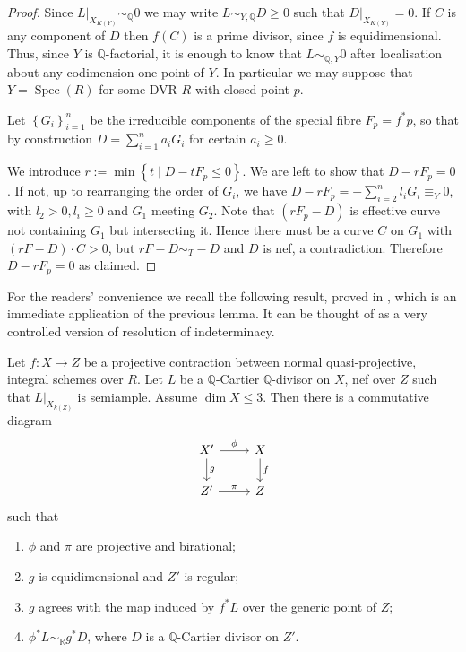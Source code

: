 \documentclass[a4paper,12pt]{book}
\DeclareMathOperator{\Spec}{Spec}
\newcommand{\bQ}{\mathbb{Q}}
\begin{document}
	\begin{proof}
		Since $L|_{X_{K(Y)}} \sim_{\mathbb{Q}} 0$ we may write $L\sim_{Y, \mathbb{Q}} D\geq 0$ such that $D|_{X_{K(Y)}}=0$. If $C$ is any component of $D$ then $f(C)$ is a prime divisor, since $f$ is equidimensional. Thus, since $Y$ is $\mathbb{Q}$-factorial, it is enough to know that $L \sim_{\bQ,Y} 0$ after localisation about any codimension one point of $Y$. In particular we may suppose that $Y= \Spec (R)$ for some DVR $R$ with closed point $p$.
		
		Let $\left\{G_i \right\}_{i=1}^n$ be the irreducible components of the special fibre $F_p=f^*p$, so that by construction $D = \sum_{i=1}^n a_i G_i$ for certain $a_i \geq 0$.	
		
		We introduce $r:= \min \left\{ t \mid D -tF_p \leq 0 \right\}$. We are left to show that $D-rF_p=0$. 
		If not, up to rearranging the order of $G_i$, we have $D-rF_p=-\sum_{i=2}^n l_i G_i \equiv_Y 0$, with $l_2 >0, l_i \geq 0$ and $G_{1}$ meeting $G_{2}$. Note that $(rF_p-D)$ is effective curve not containing $G_{1}$ but intersecting it. Hence there must be a curve $C$ on $G_{1}$ with $(rF-D) \cdot C >0$, but $rF-D \sim_{T} -D$ and $D$ is nef, a contradiction. Therefore $D-rF_p=0$ as claimed.
	\end{proof}
	
	
	For the readers' convenience we recall the following result, proved in \cite[Lemma 9.24]{bhatt2020}, which is an immediate application of the previous lemma. It can be thought of as a very controlled version of resolution of indeterminacy.
	
	\begin{lemma}\label{two}
		Let $f \colon X \to Z$ be a projective contraction between normal quasi-projective, integral schemes over $R$.
		Let $L$ be a $\mathbb{Q}$-Cartier $\mathbb{Q}$-divisor on $X$, nef over $Z$ such that $L|_{X_{k(Z)}}$ is semiample.
		Assume $\dim X \leq 3$. Then there is a commutative diagram 
		\[\begin{tikzcd}
		X' \arrow[d, "g"] \arrow[r, "\phi"] & X \arrow[d, "f"] \\
		Z' \arrow[r, "\pi"]                 & Z               
		\end{tikzcd}\]
		such that 
		\begin{enumerate}
			\item $\phi$ and $\pi$ are projective and birational;
			\item  $g$ is equidimensional and $Z'$ is regular;
			\item $g$ agrees with the map induced by $f^*L$ over the generic point of $Z$;
			\item $\phi^{*}L \sim_{\mathbb{R}} g^{*}D$, where $D$ is a $\mathbb{Q}$-Cartier divisor on $Z'$.
		\end{enumerate}  
	\end{lemma}
	
\end{document}
